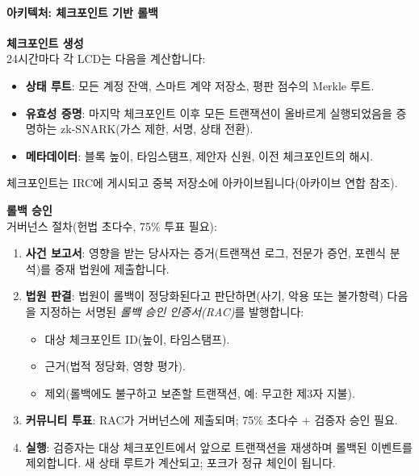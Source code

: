\documentclass[11pt]{article}
\begin{document}
\paragraph{아키텍처: 체크포인트 기반 롤백}
\textbf{체크포인트 생성}\\
24시간마다 각 LCD는 다음을 계산합니다:
\begin{itemize}[noitemsep]
  \item \textbf{상태 루트}: 모든 계정 잔액, 스마트 계약 저장소, 평판 점수의 Merkle 루트.
  \item \textbf{유효성 증명}: 마지막 체크포인트 이후 모든 트랜잭션이 올바르게 실행되었음을 증명하는 zk-SNARK(가스 제한, 서명, 상태 전환).
  \item \textbf{메타데이터}: 블록 높이, 타임스탬프, 제안자 신원, 이전 체크포인트의 해시.
\end{itemize}
체크포인트는 IRC에 게시되고 중복 저장소에 아카이브됩니다(아카이브 연합 참조).

\textbf{롤백 승인}\\
거버넌스 절차(헌법 초다수, 75\% 투표 필요):
\begin{enumerate}[noitemsep]
  \item \textbf{사건 보고서}: 영향을 받는 당사자는 증거(트랜잭션 로그, 전문가 증언, 포렌식 분석)를 중재 법원에 제출합니다.
  \item \textbf{법원 판결}: 법원이 롤백이 정당화된다고 판단하면(사기, 악용 또는 불가항력) 다음을 지정하는 서명된 \emph{롤백 승인 인증서(RAC)}를 발행합니다:
    \begin{itemize}[noitemsep]
      \item 대상 체크포인트 ID(높이, 타임스탬프).
      \item 근거(법적 정당화, 영향 평가).
      \item 제외(롤백에도 불구하고 보존할 트랜잭션, 예: 무고한 제3자 지불).
    \end{itemize}
  \item \textbf{커뮤니티 투표}: RAC가 거버넌스에 제출되며; 75\% 초다수 + 검증자 승인 필요.
  \item \textbf{실행}: 검증자는 대상 체크포인트에서 앞으로 트랜잭션을 재생하며 롤백된 이벤트를 제외합니다. 새 상태 루트가 계산되고; 포크가 정규 체인이 됩니다.
\end{enumerate}
\end{document}
